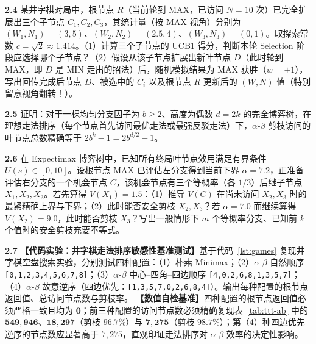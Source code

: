 \textbf{2.4} \quad 某井字棋对局中，根节点 $R$（当前轮到 \textsf{MAX}，已访问 $N=10$ 次）已完全扩展出三个子节点 $C_1, C_2, C_3$，其统计量（按 \textsf{MAX} 视角）分别为 $(W_1, N_1)=(3, 5)$、$(W_2, N_2)=(2.5, 4)$、$(W_3, N_3)=(0, 1)$。取探索常数 $c=\sqrt{2}\approx 1.414$。（1）计算三个子节点的 UCB1 得分，判断本轮 Selection 阶段应选择哪个子节点？（2）假设从该子节点扩展出新叶节点 $D$（此时轮到 \textsf{MAX}，即 $D$ 是 \textsf{MIN} 走出的招法）后，随机模拟结果为 \textsf{MAX} 获胜（$w=+1$），写出回传完成后节点 $D$、被选中的 $C_i$ 以及根节点 $R$ 更新后的 $(W, N)$ 值（特别留意视角翻转！）。


\textbf{2.5} \quad 证明：对于一棵均匀分支因子为 $b \ge 2$、高度为偶数 $d = 2k$ 的完全博弈树，在理想走法排序（每个节点首先访问最优走法或最强反驳走法）下，$\alpha$-$\beta$ 剪枝访问的叶节点总数精确等于 $2 b^k - 1 = 2 b^{d/2} - 1$。

\textbf{2.6} \quad 在 Expectimax 博弈树中，已知所有终局叶节点效用满足有界条件 $U(s) \in [0, 10]$。设根节点 \textsf{MAX} 已评估左分支得到当前下界 $\alpha = 7.2$，正准备评估右分支的一个机会节点 $C$，该机会节点有三个等概率（各 $1/3$）后继子节点 $X_1, X_2, X_3$。若先算得 $V(X_1) = 1.5$：（1）推导 $V(C)$ 在尚未访问 $X_2, X_3$ 时的最紧精确上界与下界；（2）此时能否安全剪枝 $X_2, X_3$？若 $\alpha = 7.0$ 而继续算得 $V(X_2) = 9.0$，此时能否剪枝 $X_3$？写出一般情形下 $m$ 个等概率分支、已知前 $k$ 个值时的安全剪枝充要不等式。


\textbf{2.7} \quad \textbf{【代码实验：井字棋走法排序敏感性基准测试】}基于代码~\ref{lst:games} 复现井字棋空盘搜索实验，分别测试四种配置：（1）朴素 Minimax；（2）$\alpha$-$\beta$ 自然顺序 \texttt{[0,1,2,3,4,5,6,7,8]}；（3）$\alpha$-$\beta$ 中心--四角--四边顺序 \texttt{[4,0,2,6,8,1,3,5,7]}；（4）$\alpha$-$\beta$ 故意逆序（四边优先：\texttt{[1,3,5,7,0,2,6,8,4]}）。输出每种配置的根节点返回值、总访问节点数与剪枝率。
\textbf{【数值自检基准】}四种配置的根节点返回值必须严格一致且均为 $\mathbf{0}$；前三种配置的访问节点数必须精确复现表~\ref{tab:ttt-ab} 中的 $\mathbf{549{,}946}$、$\mathbf{18{,}297}$（剪枝 $96.7\%$）与 $\mathbf{7{,}275}$（剪枝 $98.7\%$）；第（4）种四边优先逆序的节点数应显著高于 $7{,}275$，直观印证走法排序对 $\alpha$-$\beta$ 效率的决定性影响。

